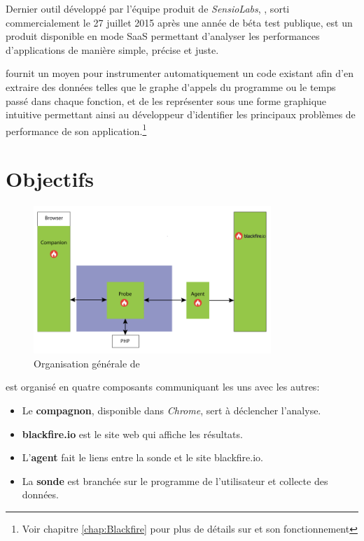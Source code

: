 Dernier outil développé par l'équipe produit de \emph{SensioLabs}, \Blackfire,
sorti commercialement le 27 juillet 2015 après une année de béta test publique, est un produit disponible en mode \gls{SaaS} permettant d'analyser les performances d'applications \PHP de manière simple, précise et juste.

\Blackfire fournit un moyen pour instrumenter automatiquement un code \PHP existant afin d'en extraire des données telles que le \gls{graphe d'appels} du programme ou le temps passé dans chaque fonction, et de les représenter sous une forme graphique intuitive permettant ainsi au développeur d'identifier les principaux problèmes de performance de son application.\footnote{Voir chapitre \vref{chap:Blackfire} pour plus de détails sur \Blackfire et son fonctionnement}


\chapter{Objectifs}
	\setcounter{chapter}{2}
	
\begin{figure}[!h]
\begin{center}
  \includegraphics[width=0.8\textwidth]{images/schemas/workflow/archi-general}
  \caption{Organisation générale de \Blackfire}
\end{center}
\end{figure}

\Blackfire est organisé en quatre composants communiquant les uns avec les autres:
\begin{itemize}
\item Le \textbf{compagnon}, disponible dans \emph{Chrome}, sert à déclencher l'analyse.
\item \textbf{blackfire.io} est le site web qui affiche les résultats.
\item L'\textbf{agent} fait le liens entre la sonde et le site blackfire.io.
\item La \textbf{sonde} est branchée sur le programme de l'utilisateur et collecte des données.
\end{itemize}

